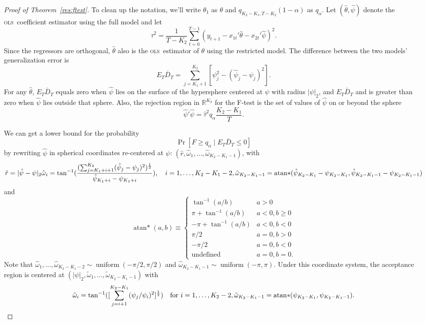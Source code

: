 \documentclass[11pt]{article}
\DeclareMathOperator{\atan}{atan*}
\newcommand{\oosB}{\bar{D}_{T}}
\newcommand{\ols}{\textsc{ols}}
\renewcommand{\Re}{\ensuremath{\mathbb{R}}}
\begin{document}
\begin{proof}[Proof of Theorem~\ref{res:ftest}]
  To clean up the notation, we'll write $\theta_1$ as $\theta$ and
  $q_{K_2-K_1,T-K_2}(1-\alpha)$ as $q_\alpha$.  Let
  $(\hat{\theta}, \hat{\psi})$ denote the \ols\ coefficient estimator
  using the full model and let 
  \[\hat\tau^2 = \frac{1}{T-K_2}\sum_{t=0}^{T-1} (y_{t+1} - x_{1t}'\hat{\theta} -
  x_{2t}'\hat{\psi})^2. \] Since the regressors are orthogonal,
  $\hat\theta$ also is the \ols\ estimator of $\theta$ using the
  restricted model.  The difference between the two models'
  generalization error is
\[
E_T \oosB = \sum_{j=K_1+1}^{K_2} [\psi_j^2 - (\hat{\psi}_j - \psi_j)^2].
\]
For any $\hat{\theta}$, $E_T \oosB$ equals zero when $\hat{\psi}$ lies
on the surface of the hypersphere centered at $\psi$ with radius
$|\psi|_2$, and $E_T \oosB$ and is greater than zero when $\hat{\psi}$
lies outside that sphere.  Also, the rejection region in $\Re^{K_2}$
for the F-test is the set of values of $\hat{\psi}$ on or beyond the
sphere
\[
\hat{\psi}'\hat{\psi} = \hat{\tau}^2 q_\alpha \frac{K_2-K_1}{T}.
\]

We can get a lower bound for the probability
\[\Pr[F \geq q_\alpha \mid E_T \oosB \leq 0]\]
by rewriting $\hat{\psi}$ in spherical coordinates re-centered at
$\psi$: $(\hat{r}, \hat{\omega}_1, \dots,
\hat{\omega}_{K_2-K_1-1})$, with 
\[\hat{r} = |\hat{\psi} - \psi|_2 \\
\hat{\omega}_{i} = \tan^{-1}(\frac{(\sum\nolimits_{j=K_1+i+1}^{K_2}(\hat{\psi}_j -
    \psi_j)^2)^{\frac12}}{\hat{\psi}_{K_1+i} - \psi_{K_1+i}}), \quad
  i=1,\dots,K_2-K_1-2, \\
\hat{\omega}_{K_2-K_1-1} =\atan(\hat{\psi}_{K_2-K_1} - \psi_{K_2-K_1},
  \hat{\psi}_{K_2-K_1-1}- \psi_{K_2-K_1-1} )
\]
and
\[
\atan(a, b) \equiv 
\begin{cases}
\tan^{-1}(a/b) & a > 0 \\
\pi + \tan^{-1}(a/b) & a < 0, b \geq 0 \\
-\pi + \tan^{-1}(a/b) & a < 0, b < 0 \\
\pi/2 & a = 0, b > 0 \\
- \pi/2 & a = 0, b < 0 \\
\text{undefined} & a = 0, b = 0.
\end{cases}
\]
Note that $\hat{\omega}_1,\dots,\hat{\omega}_{K_2-K_1 - 2} \sim
\operatorname{uniform}(-\pi/2, \pi/2)$ and
$\hat{\omega}_{K_2-K_1-1}\sim \operatorname{uniform}(-\pi, \pi)$.
Under this coordinate system, the acceptance region is centered at
$(|\psi|_2, \tilde{\omega}_1, \dots, \tilde{\omega}_{K_2-K_1-1})$ with
\[
\tilde{\omega}_i = \tan^{-1}([\sum_{j=i+1}^{K_2-K_1}
  (\psi_j/\psi_i)^2]^{\frac12}) \quad \text{for } i = 1,\dots,K_2-2,\\
\tilde{\omega}_{K_2-K_1-1} = \atan(\psi_{K_2-K_1}, \psi_{K_2-K_1-1}).
\]


\end{proof}
\end{document}

